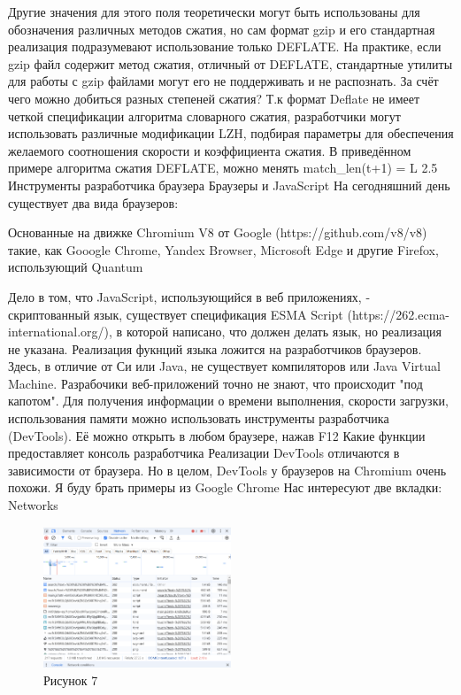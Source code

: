 \documentclass[12pt]{article}
\begin{document}
Другие значения для этого поля теоретически могут быть использованы для обозначения различных методов сжатия, но сам формат gzip и его стандартная реализация подразумевают использование только DEFLATE. На практике, если gzip файл содержит метод сжатия, отличный от DEFLATE, стандартные утилиты для работы с gzip файлами могут его не поддерживать и не распознать.
За счёт чего можно добиться разных степеней сжатия?
Т.к формат Deflate не имеет четкой спецификации алгоритма словарного сжатия, разработчики могут использовать различные модификации LZH, подбирая параметры для обеспечения желаемого соотношения скорости и коэффициента сжатия.
В приведённом примере алгоритма сжатия DEFLATE, можно менять match_len(t+1) = L
2.5 Инструменты разработчика браузера
Браузеры и JavaScript
На сегодняшний день существует два вида браузеров:

Основанные на движке Chromium V8 от Google (https://github.com/v8/v8) такие, как Gooogle Chrome, Yandex Browser, Microsoft Edge и другие
Firefox, использующий Quantum

Дело в том, что JavaScript, использующийся в веб приложениях, - скриптованный язык, существует спецификация ESMA Script (https://262.ecma-international.org/), в которой написано, что должен делать язык, но реализация не указана. Реализация фукнций языка ложится на разработчиков браузеров. Здесь, в отличие от Си или Java, не существует компиляторов или Java Virtual Machine. Разрабочики веб-приложений точно не знают, что происходит "под капотом".
Для получения информации о времени выполнения, скорости загрузки, использования памяти можно использовать инструменты разработчика (DevTools). Её можно открыть в любом браузере, нажав F12
Какие функции предоставляет консоль разработчика
Реализации DevTools отличаются в зависимости от браузера. Но в целом, DevTools у браузеров на Chromium очень похожи.
Я буду брать примеры из Google Chrome
Нас интересуют две вкладки:
Networks
\begin{figure}[h!]
\centering
\includegraphics[width=0.5\textwidth]{../images/network.png}
\caption{Рисунок 7}
\end{figure}
\end{document}
